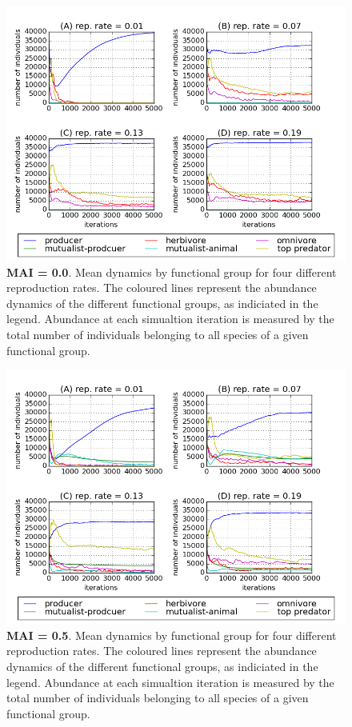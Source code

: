 \begin{figure}
	\centering
	\includegraphics[width=0.8\linewidth]{"figures/persistence/rr_mean_trophic_dynamics_mai00"}
	\caption{\textbf{MAI = 0.0}. Mean dynamics by functional group for four different reproduction rates. The coloured lines represent the abundance dynamics of the different functional groups, as indiciated in the legend. Abundance at each simualtion iteration is measured by the total number of individuals belonging to all species of a given functional group.}
	\label{fig:rr_mean_troph_dynamics_mai0}
\end{figure}

\begin{figure}
	\centering
	\includegraphics[width=0.8\linewidth]{"figures/persistence/rr_mean_trophic_dynamics_mai05"}
	\caption{\textbf{MAI = 0.5}. Mean dynamics by functional group for four different reproduction rates. The coloured lines represent the abundance dynamics of the different functional groups, as indiciated in the legend. Abundance at each simualtion iteration is measured by the total number of individuals belonging to all species of a given functional group.}
	\label{fig:rr_mean_troph_dynamics_mai05}
\end{figure}

